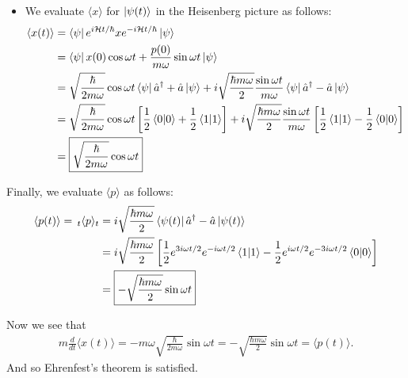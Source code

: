 \documentclass{article}
\theoremstyle{definition}
\newcommand{\ham}{\mathcal{H}}
\newcommand{\f}[2]{\frac{#1}{#2}}
\newcommand{\lb}{\left[}
\newcommand{\rb}{\right]}
\begin{document}
\begin{enumerate}[label=(\alph*)]
\begin{itemize}
		
		\item We evaluate $\langle x \rangle$ for $\ket{\psi(t)}$ in the Heisenberg picture as follows:
		\begin{align*}
		\langle x(t) \rangle 
		&= \bra{\psi} e^{i\ham t/\hbar} x e^{-i\ham t/\hbar} \ket{\psi} \\
		&= \bra{\psi} x(0)\cos\omega t + \f{p(0)}{m\omega}\sin\omega t \ket{\psi} \\
		&= \sqrt{\f{\hbar}{2m\omega}}\cos\omega t\bra{\psi}\hat a^\dagger + \hat a \ket{\psi} + i\sqrt{\f{\hbar m \omega}{2}}\f{\sin\omega t}{m\omega} \bra{\psi} \hat a^\dagger - \hat a \ket{\psi} \\
		&= \sqrt{\f{\hbar}{2m\omega}}\cos\omega t \lb \f{1}{2}\braket{0} + \f{1}{2}\braket{1} \rb + i\sqrt{\f{\hbar m \omega}{2}} \f{\sin\omega t}{m\omega} \lb \f{1}{2}\braket{1} - \f{1}{2}\braket{0} \rb \\
		&= \boxed{\sqrt{\f{\hbar}{2m\omega}}\cos\omega t}
		\end{align*}
	\end{itemize}
	
	Finally, we evaluate $\langle p \rangle$ as follows:
	\begin{align*}
	\langle p(t)\rangle = \,_t\langle p \rangle_t &= i\sqrt{\f{\hbar m \omega}{2}}\bra{\psi(t)}\hat a^\dagger - \hat a \ket{\psi(t)} \\
	&=  i\sqrt{\f{\hbar m \omega}{2}}\lb \f{1}{2} e^{3i\omega t/2} e^{-i\omega t/2}\braket{1} - \f{1}{2}e^{i\omega t/2}e^{-3i\omega t/2}\braket{0} \rb \\
	&= \boxed{-\sqrt{\f{\hbar m \omega}{2}}\sin \omega t}
	\end{align*}
	
	Now we see that 
	\begin{align*}
	m \f{d}{dt} \langle x(t) \rangle = -m\omega \sqrt{\f{\hbar}{ 2 m \omega}} \sin\omega t = -\sqrt{\f{\hbar m \omega}{2}}\sin \omega t = \langle p(t) \rangle.
	\end{align*}
	And so Ehrenfest's theorem is satisfied.
	
	
	

\end{enumerate}
\end{document}
